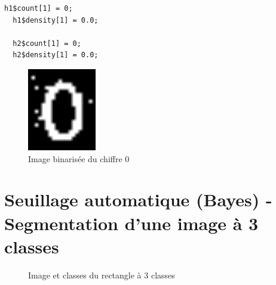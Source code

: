\documentclass[a4paper,11pt]{article}
\begin{document}
  \begin{lstlisting}[caption=Annuler les pixels de fond]
  h1$count[1] = 0;
  h1$density[1] = 0.0;
  
  h2$count[1] = 0;
  h2$density[1] = 0.0;\end{lstlisting}
  
  \begin{figure}[H]
    \center
    \includegraphics[width=3cm]{resultat/binZeroBayes.png}
    \caption{Image binarisée du chiffre 0}
  \end{figure}
  
  \section{Seuillage automatique (Bayes) - Segmentation d’une image à 3 classes}
  
  \begin{figure}[H]
    \center
    \caption{Image et classes du rectangle à 3 classes}
  \end{figure}
  
\end{document}
